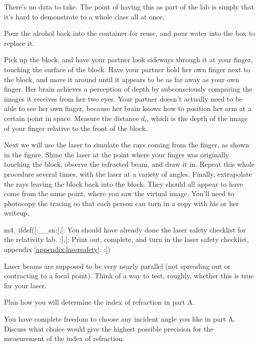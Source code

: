 There's no data
to take.
The point of having this as part of the lab is simply that
it's hard to demonstrate to a whole class all at once.


Pour the alcohol back into the container for reuse, and pour water
into the box to replace it.

Pick up the block, and have your partner look sideways
through it at your finger, touching the surface of the
block. Have your partner hold her own finger next to the
block, and move it around until it appears to be as far away
as your own finger. Her brain achieves a perception of
depth by subconsciously comparing the images it receives
from her two eyes. Your partner doesn't actually need to be
able to see her own finger, because her brain knows how to
position her arm at a certain point in space.
 Measure the distance $d_i$, which is
the depth of the image of your finger relative to the front of the block.



Next we will use the laser to simulate the rays coming from the finger,
as shown in the figure.
Shine the laser at the point
where your finger was originally touching the block, observe
the refracted beam, and draw it in. Repeat this whole
procedure several times, with the laser at a variety of
angles. Finally, extrapolate the rays leaving the block back
into the block. They should all appear to have come from the
same point, where you saw the virtual image. You'll need to
photocopy the tracing so that each person can turn in a copy
with his or her writeup.

\prelab

m4_ifdef([:__sn:],[:%
You should have already done the laser safety checklist for the relativity lab.
:],[:
Print out, complete, and turn in the laser safety checklist, appendix \ref{appendix:lasersafety}.
:])

\prelabquestion  Laser beams are supposed to be very nearly parallel (not
spreading out or contracting to a focal point). Think of a
way to test, roughly, whether this is true for your laser.

\prelabquestion  Plan how you will determine the index of refraction in part A.

\prelabquestion  You have complete freedom to choose any incident angle you
like in part A. Discuss what choice would give the highest possible precision
for the measurement of the index of refraction.

